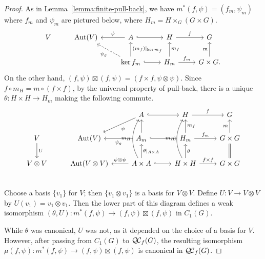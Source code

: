 \documentclass[11pt]{amsart}
\theoremstyle{plain}
\theoremstyle{definition}
\theoremstyle{remark}
\newcommand{\bFq}{\bar{k}}
\newcommand{\Fq}{k}
\DeclareMathOperator{\Gal}{Gal}
\newcommand{\Frob}[1]{{\operatorname{F}_{#1}}}
\DeclareMathOperator{\Aut}{Aut}
\newcommand{\ceq}{{\, :=\, }}
\newcommand{\QC}{{\mathcal{Q\hskip-0.8pt C}}}
\newcommand{\QCf}{{\QC_f}}
\newcommand\Clifton[1]{\marginpar{\smaller\smaller CC: #1}}
\begin{document}
\begin{proof}
As in Lemma~\ref{lemma:finite-pull-back}, we have $m^*(f,\psi) = (f_m,\psi_m)$ where $f_m$ and $\psi_m$ are pictured below, where $H_m = H\times_G(G\times G)$.
\[
\begin{tikzcd}
V & \Aut(V) & \arrow[swap]{l}{\psi} A \arrow[hook]{r} & H \arrow{r}{f} &  G\\
  &  & \arrow[dashed]{ul}{\psi_g} \arrow[swap]{u}{(m_f)\vert_{\ker m_f}} \ker f_m \arrow[hook]{r} & \arrow[swap]{u}{m_f} H_m \arrow{r}{f_m} & \arrow{u}{m} G\times G.
\end{tikzcd}
\]
On the other hand, $(f,\psi) \boxtimes (f,\psi) = (f\times f, \psi\otimes \psi)$.
Since $f\circ m_H = m \circ (f\times f)$, by the universal property of pull-back, there is a unique $\theta : H\times H \to H_m$ making the following commute.
\[
\begin{tikzcd}
\ &  & \arrow{ld}{\psi} A \arrow[hook]{r} & H \arrow{r}{f} &  G\\
V \arrow{d}{U} & \Aut(V)  & \arrow{l}{\psi_g} \arrow{u} A_m \arrow[hook]{r} & \arrow[swap]{u}{m_f} H_m \arrow{r}{f_m} & \arrow{u}{m} G\times G\\
V\otimes V & \Aut(V\otimes V) & \arrow[swap]{l}{\psi\otimes\psi} \arrow[bend left]{uu}{m_H} \arrow[swap]{u}{\theta\vert_{A\times A}} A \times A \arrow[hook]{r}{} & \arrow[bend left]{uu}{m_H} \arrow[swap]{u}{\theta} H \times H \arrow{r}{f\times f} & \arrow[equal]{u} G\times G\\
\end{tikzcd}
\]
Choose a basis $\{ v_1 \}$ for $V$; then $\{ v_1\otimes v_1 \}$ is a basis for $V\otimes V$. Define $U : V \to V\otimes V$ by $U(v_1) = v_1\otimes v_1$. Then the lower part of this diagram defines a weak isomorphism $(\theta,U): m^*(f,\psi) \to (f,\psi)\boxtimes (f,\psi)$  in $C_1(G)$. 

While $\theta$ was canonical, $U$ was not, as it depended on the choice of a basis for $V$. However, after passing from $C_1(G)$ to $\QCf(G)$, the resulting isomorphism $\mu(f,\psi): m^*(f,\psi) \to (f,\psi)\boxtimes (f,\psi)$ is canonical in $\QCf(G)$.
\end{proof}



\end{document}

